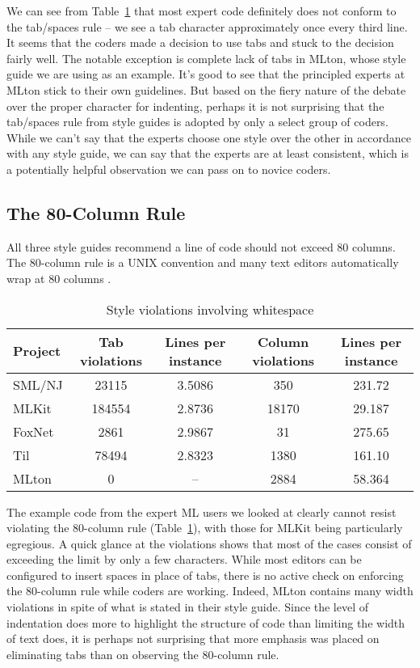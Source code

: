 \documentclass[12pt,abstracton]{scrartcl}
\begin{document}
We can see from Table~\ref{table:whitespace} that most expert code definitely does
not conform to the tab/spaces rule -- we see a tab character approximately once every third line.
It seems that the coders made a decision to use tabs and stuck to the decision fairly well.
The notable exception is complete lack of tabs in MLton, whose style guide we are using as an example.
It's good to see that the principled experts at MLton stick to their own guidelines.
But based on the fiery nature of the debate over the proper character
for indenting, perhaps it is not surprising that the tab/spaces
rule from style guides is adopted by only a select group of coders.
While we can't say that the experts choose one style over the other in accordance with
any style guide, we can say that the experts are at least consistent, which is
a potentially helpful observation we can pass on to novice coders.
\subsection{The 80-Column Rule}\label{subsec:80}
All three style guides recommend a line of code should not exceed 80 columns.
The 80-column rule is a UNIX convention and many text editors automatically
wrap at 80 columns \cite{Cmu12}.

\begin{table}[t!]
\centering
\begin{tabular}{|l||c|c||c|c|}
\hline
Project & Tab violations & Lines per instance & Column violations & Lines per instance \\ \hline\hline
SML/NJ & 23115 & 3.5086 & 350 & 231.72 \\
MLKit & 184554 & 2.8736 & 18170 & 29.187 \\
FoxNet & 2861 & 2.9867 & 31 & 275.65 \\
Til & 78494 & 2.8323 & 1380 & 161.10 \\
MLton & 0 & -- & 2884 & 58.364 \\ \hline
\end{tabular}
\caption{Style violations involving whitespace}
\label{table:whitespace}
\end{table}

The example code from the expert ML users we looked at clearly cannot
resist violating the 80-column rule (Table~\ref{table:whitespace}), with
those for MLKit being particularly egregious. A quick glance
at the violations shows that most of the cases consist of exceeding the limit
by only a few characters. While most editors can be configured to insert
spaces in place of tabs, there is no active check on enforcing the 80-column
rule while coders are working.
Indeed, MLton contains many width violations in spite of what is stated in their style guide.
Since the level of indentation does more to highlight the structure of code than
limiting the width of text does, it is perhaps not surprising that more
emphasis was placed on eliminating tabs than on observing the 80-column rule.
\end{document}
